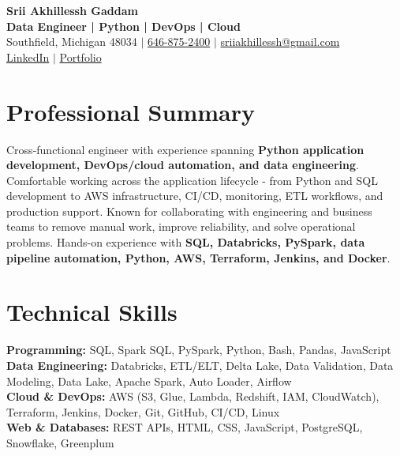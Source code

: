 \documentclass[letterpaper,10pt]{article}
\begin{document}
\fontsize{9.35pt}{10.45pt}\selectfont

\begin{center}
    {\LARGE \textbf{Srii Akhillessh Gaddam}} \\[-1pt]
    \textbf{Data Engineer | Python | DevOps | Cloud} \\[2pt]
    Southfield, Michigan 48034 $|$
    \href{tel:6468752400}{646-875-2400} $|$
    \href{mailto:sriiakhillessh@gmail.com}{sriiakhillessh@gmail.com} \\[1pt]
    \href{https://www.linkedin.com/in/srii-akhiilessh-gaddam-b48668191/}{LinkedIn} $|$
    \href{https://sriiakhillesshg.github.io/portfolio/}{Portfolio}
\end{center}
\vspace{-8pt}

\section{Professional Summary}
\small{Cross-functional engineer with experience spanning \textbf{Python application development, DevOps/cloud automation, and data engineering}. Comfortable working across the application lifecycle - from Python and SQL development to AWS infrastructure, CI/CD, monitoring, ETL workflows, and production support. Known for collaborating with engineering and business teams to remove manual work, improve reliability, and solve operational problems. Hands-on experience with \textbf{SQL, Databricks, PySpark, data pipeline automation, Python, AWS, Terraform, Jenkins, and Docker}.}

\section{Technical Skills}
\small{
\textbf{Programming:} SQL, Spark SQL, PySpark, Python, Bash, Pandas, JavaScript \\
\textbf{Data Engineering:} Databricks, ETL/ELT, Delta Lake, Data Validation, Data Modeling, Data Lake, Apache Spark, Auto Loader, Airflow \\
\textbf{Cloud \& DevOps:} AWS (S3, Glue, Lambda, Redshift, IAM, CloudWatch), Terraform, Jenkins, Docker, Git, GitHub, CI/CD, Linux \\
\textbf{Web \& Databases:} REST APIs, HTML, CSS, JavaScript, PostgreSQL, Snowflake, Greenplum
}
\end{document}
